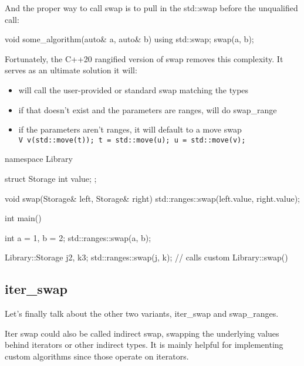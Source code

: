 And the proper way to call swap is to pull in the std::swap before the unqualified call:

\begin{box-note}
\begin{cppcode}
void some_algorithm(auto& a, auto& b) {
    using std::swap;
    swap(a, b);
}
\end{cppcode}
\end{box-note}

Fortunately, the C++20 rangified version of swap removes this complexity. It serves as an ultimate solution it will:

\begin{itemize}
    \item will call the user-provided or standard swap matching the types
    \item if that doesn’t exist and the parameters are ranges, will do swap\_range
    \item if the parameters aren’t ranges, it will default to a move swap\\
    \texttt{V v(std::move(t)); t = std::move(u); u = std::move(v);}
\end{itemize}

\begin{box-note}
\begin{cppcode}
namespace Library {
struct Storage {
    int value;
};

void swap(Storage& left, Storage& right) {
    std::ranges::swap(left.value, right.value);
}
}

int main() {
    int a = 1, b = 2;
    std::ranges::swap(a, b);

    Library::Storage j{2}, k{3};
    std::ranges::swap(j, k); // calls custom Library::swap()
}
\end{cppcode}
\end{box-note}

\subsection{iter\_swap}

Let’s finally talk about the other two variants, iter\_swap and swap\_ranges.


Iter swap could also be called indirect swap, swapping the underlying values behind iterators or other indirect types. It is mainly helpful for implementing custom algorithms since those operate on iterators.

